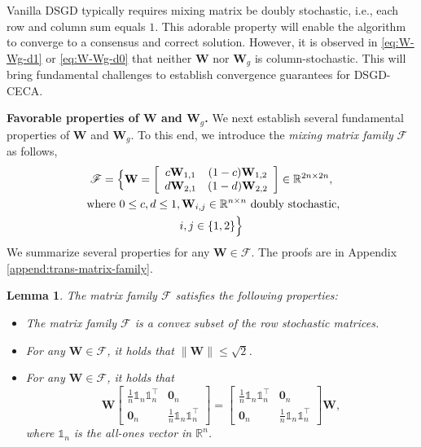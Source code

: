 \documentclass{article}
\newcommand{\vzero}{\mathbf{0}}
\newcommand{\vW}{\mathbf{W}}
\newcommand{\bbR}{\mathbb{R}}
\newcommand{\bbone}{\mathds{1}}
\newcommand{\Ours}{DSGD-CECA}
\theoremstyle{plain}
\newtheorem{lemma}[theorem]{Lemma}
\theoremstyle{definition}
\begin{document}
Vanilla DSGD typically requires mixing matrix be doubly stochastic, i.e., each row and column sum equals $1$. This adorable property will enable the algorithm to converge to a consensus and correct solution. However, it is observed in \eqref{eq:W-Wg-d1} or \eqref{eq:W-Wg-d0} that neither $\vW$ nor $\vW_g$ is column-stochastic. This will bring fundamental challenges to establish convergence guarantees for \Ours. 

\textbf{Favorable properties of $\vW$ and $\vW_g$.} We next establish several fundamental properties of $\vW$ and $\vW_g$. To this end, we introduce the \textit{mixing matrix family}
$\mathscr{F}$ as follows,
\begin{multline}
\label{eq:F-family}
\mathscr{F}=\Big\{\vW=\left[
\begin{array}{cc}
    c \vW_{1,1} & (1-c)\vW_{1,2} \\
    d\vW_{2,1} & (1-d)\vW_{2,2} 
\end{array}
\right]\in\bbR^{2n\times 2n},\\\mbox{ where } 0\leq c,d\leq 1, \vW_{i,j}\in\bbR^{n\times n} \textup{ doubly stochastic},\\ i,j\in\{1,2\}\Big\}
\end{multline}
We summarize several properties for any $\vW \in \mathscr{F}$. The proofs are in Appendix \ref{append:trans-matrix-family}. 
\begin{lemma}
\label{lem:matrix_family}
The matrix family $\mathscr{F}$ satisfies the following properties:\vspace{-3mm}
\begin{itemize}[leftmargin=10pt]
    \item The matrix family $\mathscr{F}$ is a convex subset of the row stochastic matrices. 
    \item For any $\vW\in\mathscr{F}$, it holds that $\|\vW\|\leq \sqrt 2$.
    \item For any $\vW\in\mathscr{F}$, it holds that 
\begin{equation*}
\vW
\left[
\begin{array}{cc}
    \frac{1}{n}\bbone_n\bbone_n^\top & \vzero_n \\
    \vzero_n & \frac{1}{n}\bbone_n\bbone_n^\top
\end{array}
\right]
=
\left[
\begin{array}{cc}
    \frac{1}{n}\bbone_n\bbone_n^\top & \vzero_n \\
    \vzero_n & \frac{1}{n}\bbone_n\bbone_n^\top
\end{array}
\right]
\vW,
\end{equation*}
{where $\bbone_n$ is the all-ones vector in $\bbR^n$.}
\end{itemize}
\end{lemma}
\end{document}
